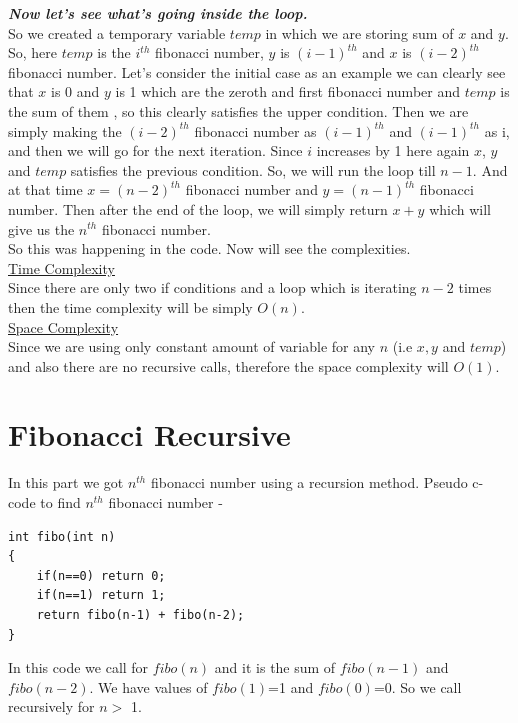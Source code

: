 \documentclass[12pt]{book}
\begin{document}
\textbf{\textit{Now let’s see what’s going inside the loop.}}\\
So we created a temporary variable $temp$ in which we are storing sum of $x$ and $y$. So, here $temp$ is the $i^{th}$ fibonacci number, $y$ is $(i-1)^{th}$ and $x$ is $(i-2)^{th}$ fibonacci number. Let’s consider the initial case as an example we can clearly see that $x$ is 0 and $y$ is 1 which are the zeroth and first fibonacci number and $temp$ is the sum of them , so this clearly satisfies the upper condition. Then we are simply making the $(i-2)^{th}$ fibonacci number as $(i-1)^{th}$ and $(i-1)^{th}$ as i, and then we will go for the next iteration. Since $i$ increases by 1 here again $x$, $y$ and $temp$ satisfies the previous condition. So, we will run the loop till $n - 1$. And at that time $x = (n-2)^{th}$ fibonacci number and $y = (n-1)^{th}$ fibonacci number. Then after the end of the loop, we will simply return $x + y$ which will give us the $n^{th}$ fibonacci number.\\

So this was happening in the code. Now will see the complexities.\\

\underline{Time Complexity}\\

	Since there are only two if conditions and a loop which is iterating $n - 2$ times then the time complexity will be simply $O(n)$.\\

\underline{Space Complexity}\\

Since we are using only constant amount of variable  for any $n$ (i.e $x ,y$ and $temp$) and also there are no recursive calls, therefore the space complexity will $O(1)$.

\section{Fibonacci Recursive}
	In this part we got $n^{th}$ fibonacci number using a recursion method. 
	Pseudo c- code to find $n^{th}$ fibonacci number - 
\begin{lstlisting}
int fibo(int n)
{
    if(n==0) return 0;
    if(n==1) return 1;
    return fibo(n-1) + fibo(n-2);
}
\end{lstlisting}

In this code we call for $fibo(n)$ and it is the sum of $fibo(n-1)$ and $fibo(n-2)$. We have values of $fibo(1)$=1 and $fibo(0)$=0.
So we call recursively for $n >$ 1.\\
\end{document}
